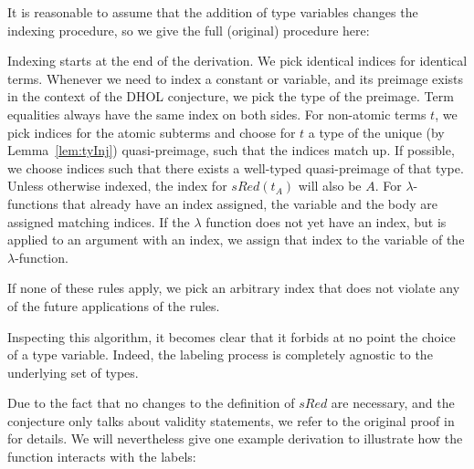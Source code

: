 \begin{remark}
  It is reasonable to assume that the addition of type variables changes the indexing
  procedure, so we give the full (original) procedure here:

  Indexing starts at the end of the derivation. We pick identical indices for identical terms.
  Whenever we need to index a constant or variable, and its preimage exists in the context of
  the DHOL conjecture, we pick the type of the preimage. Term equalities always have the same
  index on both sides. For non-atomic terms \(t\), we pick indices for the atomic subterms and
  choose for \(t\) a type of the unique (by Lemma~\ref{lem:tyInj}) quasi-preimage, such that
  the indices match up. If possible, we choose indices such that there exists a well-typed
  quasi-preimage of that type. Unless otherwise indexed, the index for \(sRed(t_A)\) will also
  be \(A\). For \(\lambda\)-functions that already have an index assigned, the variable and
  the body are assigned matching indices. If the \(\lambda\) function does not yet have an
  index, but is applied to an argument with an index, we assign that index to the variable
  of the \(\lambda\)-function.

  If none of these rules apply, we pick an arbitrary index that does not violate any of the
  future applications of the rules.

  Inspecting this algorithm, it becomes clear that it forbids at no point the choice of a type
  variable. Indeed, the labeling process is completely agnostic to the underlying set of
  types. 
\end{remark}

Due to the fact that no changes to the definition of \(sRed\) are necessary, and the conjecture
only talks about validity statements, we refer to the original proof in \cite{RRB23ext} for
details. We will nevertheless give one example derivation to illustrate how the function interacts with the labels:

